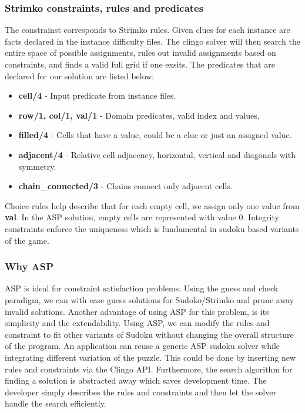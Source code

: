 \documentclass[11pt]{article}
\begin{document}
\subsubsection{Strimko constraints, rules and predicates}
The constrainst corresponds to Strimko rules. Given clues for each instance are facts declared in the instance difficulty files. The clingo solver will then search the entire space of possible assignments, rules out invalid assignments based on constraints, and finds a valid full grid if one exsits. The predicates that are declared for our solution are listed below:

\begin{itemize}
  \item \textbf{cell/4} - Input predicate from instance files.
  \item \textbf{row/1, col/1, val/1} - Domain predicates, valid index and values.
  \item \textbf{filled/4} - Cells that have a value, could be a clue or just an assigned value.
  \item \textbf{adjacent/4} - Relative cell adjacency, horizontal, vertical and diagonals with symmetry.
  \item \textbf{chain\_connected/3} - Chains connect only adjacent cells.
\end{itemize}

Choice rules help describe that for each empty cell, we assign only one value from \textbf{val}. In the ASP solution, empty cells are represented with value 0. Integrity constraints enforce the uniqueness which is fundamental in sudoku based variants of the game. 

\subsubsection{Why ASP}
ASP is ideal for constraint satisfaction problems. Using the guess and check paradigm, we can with ease guess solutions for Sudoko/Strimko and prune away invalid solutions. 
Another advantage of using ASP for this problem, is its simplicity and the extendability.
Using ASP, we can modify the rules and constraint to fit other variants of Sudoku without changing the overall structure of the program.
An application can reuse a generic ASP sudoku solver while integrating different variation of the puzzle. 
This could be done by inserting new rules and constraints via the Clingo API.
Furthermore, the search algorithm for finding a solution is abstracted away which saves development time.
The developer simply describes the rules and constraints and then let the solver handle the search efficiently.
\end{document}
